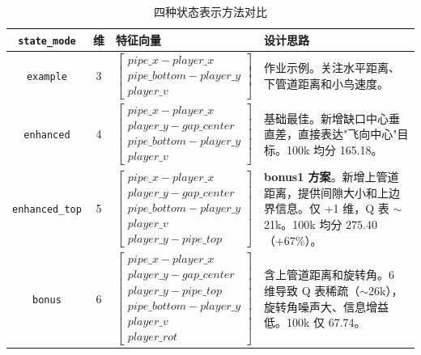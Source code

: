 \documentclass[12pt]{article}
\begin{document}
\begin{table}[H]
	\centering
	\caption{四种状态表示方法对比}
	\label{tab:state_modes}
	\small
	\begin{tabularx}{\textwidth}{cclX}
		\toprule
		\texttt{state\_mode} & 维 & 特征向量 & 设计思路 \\
		\midrule
		\texttt{example} & 3 &
		$\begin{bmatrix}
			pipe\_x - player\_x \\
			pipe\_bottom - player\_y \\
			player\_v
		\end{bmatrix}$ &
		作业示例。关注水平距离、下管道距离和小鸟速度。\\
		\midrule
		\texttt{enhanced} & 4 &
		$\begin{bmatrix}
			pipe\_x - player\_x \\
			player\_y - gap\_center \\
			pipe\_bottom - player\_y \\
			player\_v
		\end{bmatrix}$ &
		基础最佳。新增缺口中心垂直差，直接表达"飞向中心"目标。100k 均分 165.18。\\
		\midrule
		\texttt{enhanced\_top} & 5 &
		$\begin{bmatrix}
			pipe\_x - player\_x \\
			player\_y - gap\_center \\
			pipe\_bottom - player\_y \\
			player\_v \\
			player\_y - pipe\_top
		\end{bmatrix}$ &
		\textbf{bonus1 方案}。新增上管道距离，提供间隙大小和上边界信息。仅 +1 维，Q 表 $\sim$21k。100k 均分 $\mathbf{275.40}$（+67\%）。\\
		\midrule
		\texttt{bonus} & 6 &
		$\begin{bmatrix}
			pipe\_x - player\_x \\
			player\_y - gap\_center \\
			player\_y - pipe\_top \\
			pipe\_bottom - player\_y \\
			player\_v \\
			player\_rot
		\end{bmatrix}$ &
		含上管道距离和旋转角。6 维导致 Q 表稀疏（$\sim$26k），旋转角噪声大、信息增益低。100k 仅 67.74。\\
		\bottomrule
	\end{tabularx}
\end{table}
\end{document}
